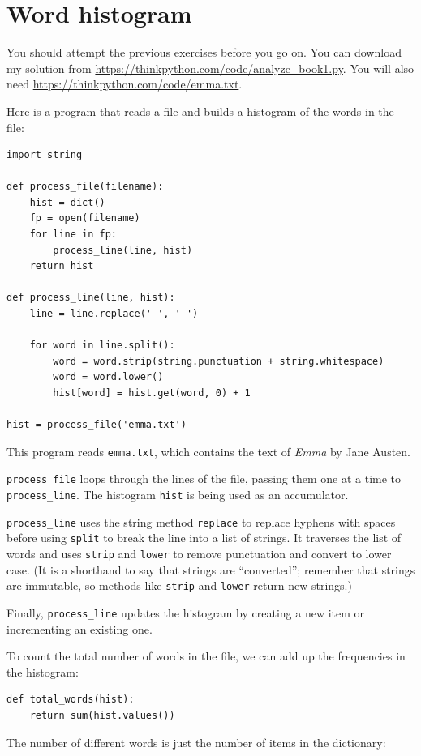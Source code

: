 \documentclass[10pt]{book}
\begin{document}
\section{Word histogram}

You should attempt the previous exercises before you go on.
You can download my solution from
 \url{https://thinkpython.com/code/analyze_book1.py}.  You will
also need \url{https://thinkpython.com/code/emma.txt}.

Here is a program that reads a file and builds a histogram of the
words in the file:

\begin{verbatim}
import string

def process_file(filename):
    hist = dict()
    fp = open(filename)
    for line in fp:
        process_line(line, hist)
    return hist

def process_line(line, hist):
    line = line.replace('-', ' ')

    for word in line.split():
        word = word.strip(string.punctuation + string.whitespace)
        word = word.lower()
        hist[word] = hist.get(word, 0) + 1

hist = process_file('emma.txt')
\end{verbatim}
%
This program reads {\tt emma.txt}, which contains the text of {\em
  Emma} by Jane Austen.

\verb"process_file" loops through the lines of the file,
passing them one at a time to \verb"process_line".  The histogram
{\tt hist} is being used as an accumulator.

\verb"process_line" uses the string method {\tt replace} to replace
hyphens with spaces before using {\tt split} to break the line into a
list of strings.  It traverses the list of words and uses {\tt strip}
and {\tt lower} to remove punctuation and convert to lower case.  (It
is a shorthand to say that strings are ``converted''; remember that
strings are immutable, so methods like {\tt strip} and {\tt lower}
return new strings.)

Finally, \verb"process_line" updates the histogram by creating a new
item or incrementing an existing one.

To count the total number of words in the file, we can add up
the frequencies in the histogram:

\begin{verbatim}
def total_words(hist):
    return sum(hist.values())
\end{verbatim}
%
The number of different words is just the number of items in
the dictionary:
\end{document}
